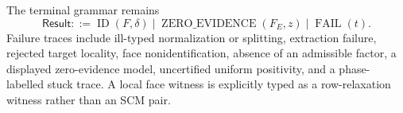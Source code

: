 The terminal grammar remains
\[
\mathsf{Result}::=\operatorname{ID}(F,\delta)\mid
\operatorname{ZERO\_EVIDENCE}(F_E,z)\mid\operatorname{FAIL}(t).
\]
Failure traces include ill-typed normalization or splitting, extraction failure, rejected target locality, face nonidentification, absence of an admissible factor, a displayed zero-evidence model, uncertified uniform positivity, and a phase-labelled stuck trace.  A local face witness is explicitly typed as a row-relaxation witness rather than an SCM pair.